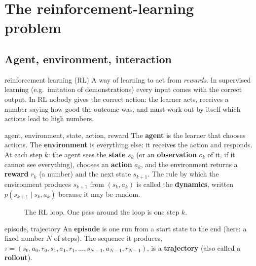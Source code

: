 \section{The reinforcement-learning problem}\label{fpo:sec:rl}

\subsection{Agent, environment, interaction}
\begin{newc}{reinforcement learning (RL)}
A way of learning to act from \emph{rewards}. In supervised learning (e.g.\ imitation of demonstrations) every input comes with the correct output. In RL nobody gives the correct action: the learner acts, receives a number saying how good the outcome was, and must work out by itself which actions lead to high numbers.
\end{newc}

\begin{newc}{agent, environment, state, action, reward}
The \textbf{agent} is the learner that chooses actions. The \textbf{environment} is everything else: it receives the action and responds. At each step $k$: the agent sees the \textbf{state} $s_k$ (or an \textbf{observation} $o_k$ of it, if it cannot see everything), chooses an \textbf{action} $a_k$, and the environment returns a \textbf{reward} $r_k$ (a number) and the next state $s_{k+1}$. The rule by which the environment produces $s_{k+1}$ from $(s_k,a_k)$ is called the \textbf{dynamics}, written $p(s_{k+1}\mid s_k,a_k)$ because it may be random.
\end{newc}

\begin{figure}[h]
\centering

\caption{The RL loop. One pass around the loop is one step $k$.}
\end{figure}

\begin{newc}{episode, trajectory}
An \textbf{episode} is one run from a start state to the end (here: a fixed number $N$ of steps). The sequence it produces, $\tau=(s_0,a_0,r_0,s_1,a_1,r_1,\dots,s_{N-1},a_{N-1},r_{N-1})$, is a \textbf{trajectory} (also called a \textbf{rollout}).
\end{newc}

